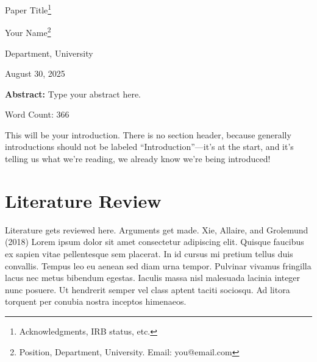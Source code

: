 \documentclass[
  11pt,
  a4paperpaper,
]{article}
\author{}
\date{\vspace{-2.5em}}
\begin{document}
\begin{titlepage}
\thispagestyle{empty}

\begin{center}
\vspace*{3cm}

{\LARGE Paper Title\footnote{Acknowledgments, IRB status, etc.} \par}

\vspace{2cm}

{\large Your Name\footnote{Position, Department, University. Email: you@email.com} \par}

\vspace{0.5cm}

{\large Department, University \par}

\vspace{1.5cm}

{\large August 30, 2025 \par}
\vspace{1.5cm}

\begin{minipage}{0.9\textwidth}
\textbf{Abstract:}  
Type your abstract here.

\vspace{0.5cm}

Word Count: 366
\end{minipage}

\end{center}
\end{titlepage}

\newpage

\doublespacing
\setlength{\parindent}{15pt}

This will be your introduction. There is no section header, because
generally introductions should not be labeled ``Introduction''---it's at
the start, and it's telling us what we're reading, we already know we're
being introduced!

\section*{Literature Review}

Literature gets reviewed here. Arguments get made. Xie, Allaire, and
Grolemund (2018) Lorem ipsum dolor sit amet consectetur adipiscing elit.
Quisque faucibus ex sapien vitae pellentesque sem placerat. In id cursus
mi pretium tellus duis convallis. Tempus leo eu aenean sed diam urna
tempor. Pulvinar vivamus fringilla lacus nec metus bibendum egestas.
Iaculis massa nisl malesuada lacinia integer nunc posuere. Ut hendrerit
semper vel class aptent taciti sociosqu. Ad litora torquent per conubia
nostra inceptos himenaeos.
\end{document}
